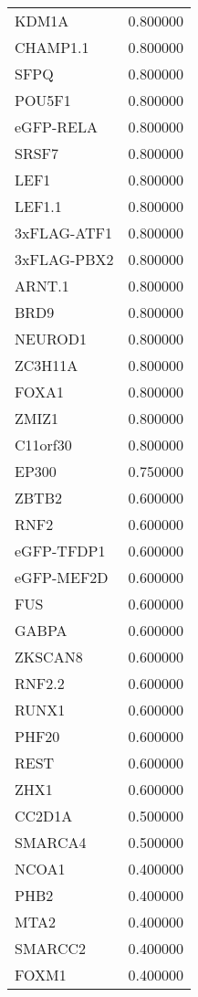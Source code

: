 \begin{longtable}{lr}
           KDM1A &  0.800000 \\
        CHAMP1.1 &  0.800000 \\
            SFPQ &  0.800000 \\
          POU5F1 &  0.800000 \\
       eGFP-RELA &  0.800000 \\
           SRSF7 &  0.800000 \\
            LEF1 &  0.800000 \\
          LEF1.1 &  0.800000 \\
     3xFLAG-ATF1 &  0.800000 \\
     3xFLAG-PBX2 &  0.800000 \\
          ARNT.1 &  0.800000 \\
            BRD9 &  0.800000 \\
         NEUROD1 &  0.800000 \\
         ZC3H11A &  0.800000 \\
           FOXA1 &  0.800000 \\
           ZMIZ1 &  0.800000 \\
        C11orf30 &  0.800000 \\
           EP300 &  0.750000 \\
           ZBTB2 &  0.600000 \\
            RNF2 &  0.600000 \\
      eGFP-TFDP1 &  0.600000 \\
      eGFP-MEF2D &  0.600000 \\
             FUS &  0.600000 \\
           GABPA &  0.600000 \\
         ZKSCAN8 &  0.600000 \\
          RNF2.2 &  0.600000 \\
           RUNX1 &  0.600000 \\
           PHF20 &  0.600000 \\
            REST &  0.600000 \\
            ZHX1 &  0.600000 \\
          CC2D1A &  0.500000 \\
         SMARCA4 &  0.500000 \\
           NCOA1 &  0.400000 \\
            PHB2 &  0.400000 \\
            MTA2 &  0.400000 \\
         SMARCC2 &  0.400000 \\
           FOXM1 &  0.400000 \\

\end{longtable}
